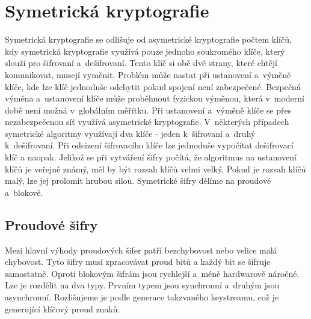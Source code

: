 \section{Symetrická kryptografie}
Symetrická kryptografie se odlišuje od asymetrické kryptografie počtem klíčů, kdy symetrická kryptografie využívá pouze jednoho soukromého klíče, který slouží pro šifrovaní a~dešifrovaní. Tento klíč si obě dvě strany, které chtějí komunikovat, musejí vyměnit. Problém může nastat při ustanovení a~výměně klíče, kde lze klíč jednoduše odchytit pokud spojení není zabezpečené. Bezpečná výměna a~ustanovení klíče může proběhnout fyzickou výměnou, která v~moderní době není možná v~globálním měřítku. Při ustanovení a~výměně klíče se přes nezabezpečenou síť využívá asymetrické kryptografie. V~některých případech symetrické algoritmy využívají dva klíče -  jeden k~šifrovaní a~druhý k~dešifrovaní. Při odcizení šifrovacího klíče lze jednoduše vypočítat dešifrovací klíč a naopak. Jelikož se při vytváření šifry počítá, že algoritmus na ustanovení klíčů je veřejně známý, měl by být rozsah klíčů velmi velký. Pokud je rozsah klíčů malý, lze jej prolomit hrubou silou. Symetrické šifry dělíme na proudové a~blokové.\cite{Nigel9780077099879ISBN}

\subsection{Proudové šifry\label{subsec:streamFunction}}%
Mezi hlavní výhody proudových šifer patří bezchybovost nebo velice malá chybovost. Tyto šifry musí zpracovávat proud bitů a každý bit se šifruje samostatně. Oproti blokovým šifrám jsou rychlejší a~méně hardwarově náročné. Lze je rozdělit na dva typy. Prvním typem jsou synchronní a~druhým jsou asynchronní. Rozlišujeme je podle generace takzvaného keystreamu, což je generující klíčový proud znaků.\cite{HavlicekBakalarka}

